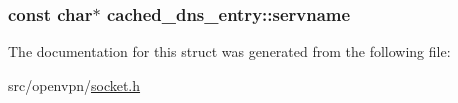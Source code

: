 \subsubsection[{servname}]{\setlength{\rightskip}{0pt plus 5cm}const char$\ast$ cached\+\_\+dns\+\_\+entry\+::servname}\label{structcached__dns__entry_a57e20fe1ffaf4e0962cf008e13fb0dc1}


The documentation for this struct was generated from the following file\+:\begin{DoxyCompactItemize}
\item 
src/openvpn/\hyperlink{socket_8h}{socket.\+h}\end{DoxyCompactItemize}
